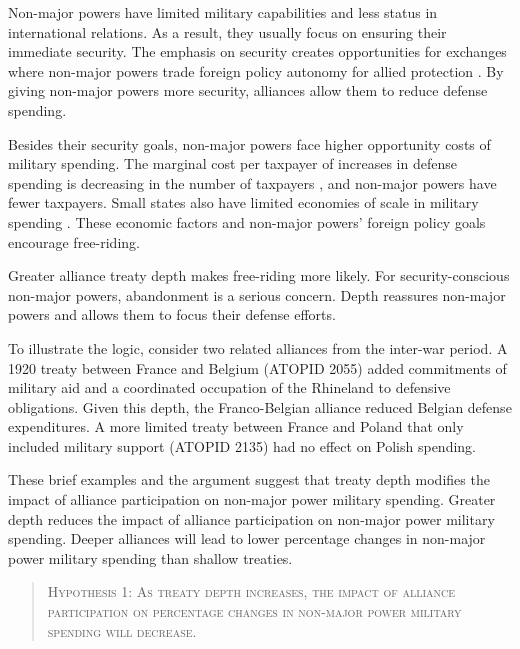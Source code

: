 \documentclass[12pt]{article}
\begin{document}
Non-major powers have limited military capabilities and less status in international relations. 
As a result, they usually focus on ensuring their immediate security.  
The emphasis on security creates opportunities for exchanges where non-major powers trade foreign policy autonomy for allied protection \citep{Altfield1984, Morrow1991}. 
By giving non-major powers more security, alliances allow them to reduce defense spending. 


Besides their security goals, non-major powers face higher opportunity costs of military spending. 
The marginal cost per taxpayer of increases in defense spending is decreasing in the number of taxpayers \citep{DudleyMontmarquette1981}, and non-major powers have fewer taxpayers. 
Small states also have limited economies of scale in military spending \citep{Moravcsik1991, Kapstein1991, Anderton1995, Devore2013}.
These economic factors and non-major powers' foreign policy goals encourage free-riding.  


Greater alliance treaty depth makes free-riding more likely. 
For security-conscious non-major powers, abandonment is a serious concern. 
Depth reassures non-major powers and allows them to focus their defense efforts. 


To illustrate the logic, consider two related alliances from the inter-war period. 
A 1920 treaty between France and Belgium (ATOPID 2055) added commitments of military aid and a coordinated occupation of the Rhineland to defensive obligations. 
Given this depth, the Franco-Belgian alliance reduced Belgian defense expenditures. 
A more limited treaty between France and Poland that only included military support (ATOPID 2135) had no effect on Polish spending.  
 
 
These brief examples and the argument suggest that treaty depth modifies the impact of alliance participation on non-major power military spending. 
Greater depth reduces the impact of alliance participation on non-major power military spending. 
Deeper alliances will lead to lower percentage changes in non-major power military spending than shallow treaties. 
 

\begin{quote}
\textsc{Hypothesis 1: As treaty depth increases, the impact of alliance participation on percentage changes in non-major power military spending will decrease.}
\end{quote}
\end{document}
